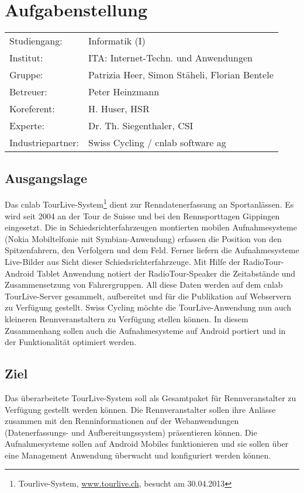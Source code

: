 \chapter*{Aufgabenstellung}

\begin{tabular}{ll}
	Studiengang: & Informatik (I) \\
	Institut: & ITA: Internet-Techn. und Anwendungen \\
	Gruppe: & Patrizia Heer, Simon Stäheli, Florian Bentele \\
	Betreuer: & Peter Heinzmann  \\
	Koreferent: & H. Huser, HSR \\
	Experte: & Dr. Th. Siegenthaler, CSI  \\
	Industriepartner: & Swiss Cycling / cnlab software ag \\    
   
\end{tabular}
\section{Ausgangslage}
Das cnlab TourLive-System\footnote{Tourlive-System, \url{www.tourlive.ch}, besucht am 30.04.2013} dient zur Renndatenerfassung an Sportanlässen. Es wird seit 2004 an der Tour de Suisse und bei den Rennsporttagen Gippingen eingesetzt. Die in Schiedsrichterfahrzeugen montierten mobilen Aufnahmesysteme (Nokia Mobiltelfonie mit Symbian-Anwendung) erfassen die Position von den Spitzenfahrern, den Verfolgern und dem Feld. Ferner liefern die Aufnahmesysteme Live-Bilder aus Sicht dieser Schiedsrichterfahrzeuge. Mit Hilfe der RadioTour-Android Tablet Anwendung notiert der RadioTour-Speaker die Zeitabstände und Zusammensetzung von Fahrergruppen. All diese Daten werden auf dem cnlab TourLive-Server gesammelt, aufbereitet und für die Publikation auf Webservern zu Verfügung gestellt. 
Swiss Cycling möchte die TourLive-Anwendung nun auch kleineren Rennveranstaltern zu Verfügung stellen können. In diesem Zusammenhang sollen auch die Aufnahmesysteme auf Android portiert und in der Funktionalität optimiert werden.

\section{Ziel}
Das überarbeitete TourLive-System soll als Gesamtpaket für Rennveranstalter zu Verfügung gestellt werden können. Die Rennveranstalter sollen ihre Anlässe zusammen mit den Renninformationen auf der Webanwendungen (Datenerfassungs- und Aufbereitungssystem) präsentieren können. Die Aufnahmesysteme sollen auf Android Mobiles funktionieren und sie sollen über eine Management Anwendung überwacht und konfiguriert werden können.

